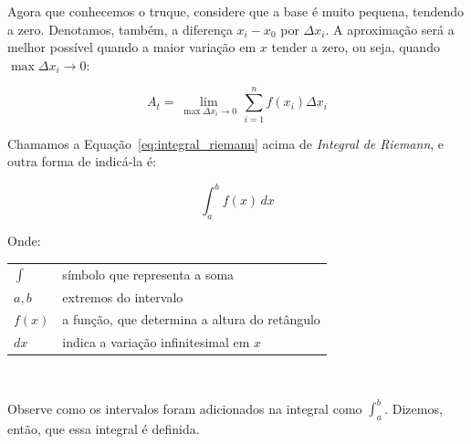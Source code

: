 \documentclass[12pt,openright,twoside,a4paper]{article}
\makeatletter
\theoremstyle{definition}
\newenvironment{condicoes}[1][Onde:]
{#1 \begin{tabular}[t]{>{$}l<{$} @{${} \implies {}$} l}}
	{\end{tabular}\\[\belowdisplayskip]}
\makeatother
\begin{document}
	\begin{center}
	\end{center}
	
	Agora que conhecemos o truque, considere que a base é muito pequena, tendendo a zero. Denotamos, também, a diferença $x_i - x_0$ por $\Delta x_i$. A aproximação será a melhor possível quando a maior variação em $x$ tender a zero, ou seja, quando $\max{\Delta x_i} \to 0$:
	
	\begin{equation}\label{eq:integral_riemann}
		\boxed{A_t = \lim_{\max{\Delta x_i} \to 0} \,\sum_{i=1}^{n} f(x_i) \Delta x_i}
	\end{equation}
	
	Chamamos a Equação~\ref{eq:integral_riemann} acima de \textit{Integral de Riemann}, e outra forma de indicá-la é:
	
	\begin{equation}
		\boxed{\int_{a}^{b} f(x)\,dx}
	\end{equation}
	
	\begin{condicoes}
		\int & símbolo que representa a soma\\
		a, b & extremos do intervalo\\
		f(x) & a função, que determina a altura do retângulo\\
		dx & indica a variação infinitesimal em $x$
	\end{condicoes}
	
	Observe como os intervalos foram adicionados na integral como $\displaystyle \int_{a}^{b}$. Dizemos, então, que essa integral é definida.
	
\end{document}
